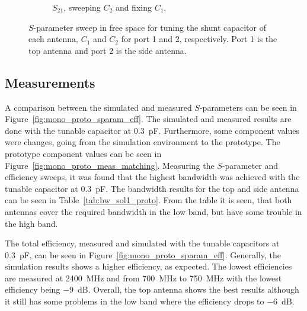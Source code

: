 \begin{figure}[htbp]
\begin{subfigure}[b]{0.49\linewidth}
        \caption{$S_{21}$, sweeping $C_2$ and fixing $C_1$.}
        \label{fig:ant1_proto_sim_s22_s12}
    \end{subfigure}
    \caption{$S$-parameter sweep in free space for tuning the shunt capacitor of each antenna, $C_1$ and $C_2$ for port 1 and 2, respectively. Port 1 is the top antenna and port 2 is the side antenna.}
    \label{fig:sparam_mono_proto_sim}
\end{figure}

\FloatBarrier
\subsection{Measurements} %
A comparison between the simulated and measured $S$-parameters can be seen in Figure~\ref{fig:mono_proto_sparam_eff}. The simulated and measured results are done with the tunable capacitor at \SI{0.3}{pF}. Furthermore, some component values were changes, going from the simulation environment to the prototype. The prototype component values can be seen in Figure~\ref{fig:mono_proto_meas_matching}. Measuring the $S$-parameter and efficiency sweeps, it was found that the highest bandwidth was achieved with the tunable capacitor at \SI{0.3}{pF}. The bandwidth results for the top and side antenna can be seen in Table~\ref{tab:bw_sol1_proto}. From the table it is seen, that both antennas cover the required bandwidth in the low band, but have some trouble in the high band. 

The total efficiency, measured and simulated with the tunable capacitors at \SI{0.3}{pF}, can be seen in Figure~\ref{fig:mono_proto_sparam_eff}. Generally, the simulation results shows a higher efficiency, as expected. The lowest efficiencies are measured at \SI{2400}{MHz} and from \SI{700}{MHz} to \SI{750}{MHz} with the lowest efficiency being \SI{-9}{dB}. Overall, the top antenna shows the best results although it still has some problems in the low band where the efficiency drops to \SI{-6}{dB}.

